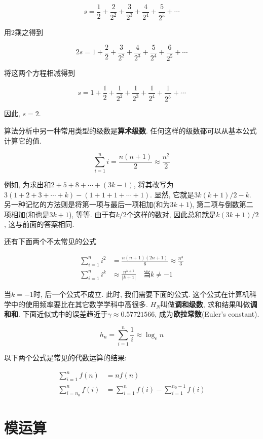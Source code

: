 \documentclass[oneside,10pt,fontset=none]{ctexbook}
\numberwithin{definition}{chapter}
\numberwithin{theorem}{chapter}
\numberwithin{lemma}{chapter}
\begin{document}
$$
s=\frac{1}{2}+\frac{2}{2^2}+\frac{3}{2^3}+\frac{4}{2^4}+\frac{5}{2^5}+\cdots
$$

用$2$乘之得到

$$
2s=1+\frac{2}{2}+\frac{3}{2^2}+\frac{4}{2^3}+\frac{5}{2^4}+\frac{6}{2^5}+\cdots
$$

将这两个方程相减得到

$$
s=1+\frac{1}{2}+\frac{1}{2^2}+\frac{1}{2^3}+\frac{1}{2^4}+\frac{1}{2^5}+\cdots
$$

因此, $s=2$.

算法分析中另一种常用类型的级数是\textbf{算术级数}. 任何这样的级数都可以从基本公式计算它的值.

$$
\sum_{i=1}^{n}i=\frac{n(n+1)}{2}\approx\frac{n^2}{2}
$$

例如, 为求出和$2+5+8+\cdots+(3k-1)$, 将其改写为$3(1+2+3+\cdots+k)-(1+1+1+\cdots+1)$. 显然, 它就是$3k(k+1)/2-k$. 另一种记忆的方法则是将第一项与最后一项相加(和为$3k+1$), 第二项与倒数第二项相加(和也是$3k+1$), 等等. 由于有$k/2$个这样的数对, 因此总和就是$k(3k+1)/2$, 这与前面的答案相同.

还有下面两个不太常见的公式

\begin{equation*}
    \begin{split}
        \sum_{i=1}^{n}i^2 &= \frac{n(n+1)(2n+1)}{6}\approx\frac{n^3}{3} \\
        \sum_{i=1}^{n}i^k &\approx\frac{n^{k+1}}{|k+1|}\quad\text{当}k\ne -1 
    \end{split}
\end{equation*}

当$k=-1$时, 后一个公式不成立. 此时, 我们需要下面的公式. 这个公式在计算机科学中的使用频率要比在其它数学学科中高很多. $H_N$叫做\textbf{调和级数}, 求和结果叫做\textbf{调和和}. 下面近似式中的误差趋近于$\gamma\approx 0.57721566$, 成为\textbf{欧拉常数}(Euler's constant).

$$
h_n=\sum_{i=1}^{n}\frac{1}{i}\approx\log_en
$$

以下两个公式是常见的代数运算的结果:

\begin{equation*}
    \begin{split}
        \sum_{i=1}^{n}f(n) &= nf(n) \\
        \sum_{i=n_0}^{n}f(i) &= \sum_{i=1}^{n}f(i) - \sum_{i=1}^{n_0-1}f(i)
    \end{split}
\end{equation*}

\section{模运算}
\end{document}
